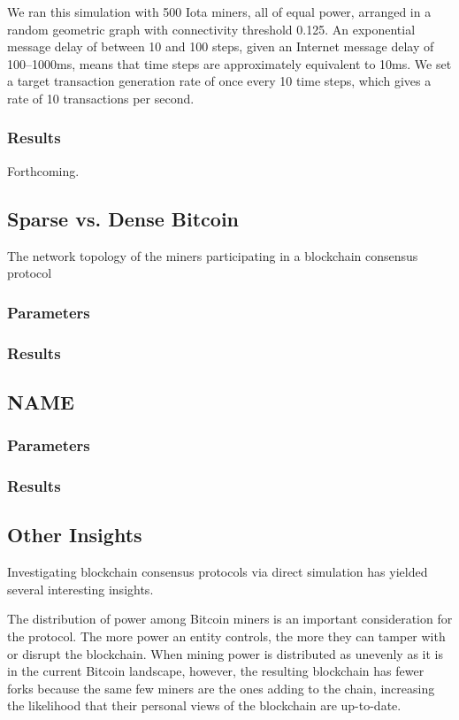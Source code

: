 \documentclass[letterpaper,11pt]{article}
\begin{document}
We ran this simulation with 500 Iota miners, all of equal power, arranged in a random geometric graph with connectivity threshold 0.125. An exponential message delay of between 10 and 100 steps, given an Internet message delay of 100--1000ms, means that time steps are approximately equivalent to 10ms. We set a target transaction generation rate of once every 10 time steps, which gives a rate of 10 transactions per second.

\subsubsection{Results}
Forthcoming.

\subsection{Sparse vs. Dense Bitcoin}
The network topology of the miners participating in a blockchain consensus protocol 

\subsubsection{Parameters}

\subsubsection{Results}

\subsection{NAME}

\subsubsection{Parameters}

\subsubsection{Results}

\subsection{Other Insights}

Investigating blockchain consensus protocols via direct simulation has yielded several interesting insights.

The distribution of power among Bitcoin miners is an important consideration for the protocol. The more power an entity controls, the more they can tamper with or disrupt the blockchain. When mining power is distributed as unevenly as it is in the current Bitcoin landscape, however, the resulting blockchain has fewer forks because the same few miners are the ones adding to the chain, increasing the likelihood that their personal views of the blockchain are up-to-date.
\end{document}
